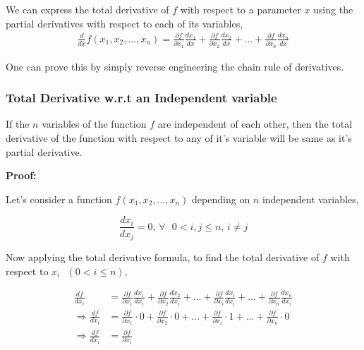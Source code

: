 \documentclass[12pt]{article}
\begin{document}
We can express the total derivative of $f$ with respect to a parameter $x$ using the partial derivatives with respect to each of its variables,
\begin{align}
    \frac{d}{dx}f(x_1, x_2, ..., x_n) = \frac{\partial f}{\partial x_1} \frac{dx_1}{dx} + \frac{\partial f}{\partial x_2} \frac{dx_2}{dx} + ... + \frac{\partial f}{\partial x_n} \frac{dx_n}{dx}
\end{align}

One can prove this by simply reverse engineering the chain rule of derivatives. \vspace{.2cm}

\subsubsection{Total Derivative w.r.t an Independent variable}

If the $n$ variables of the function $f$ are independent of each other, then the total derivative of the function with respect to any of it's variable will be same as it's partial derivative.

\begin{note}
    \textbf{Proof:} \vspace{.2cm}

    Let's consider a function $f(x_1, x_2, ..., x_n)$ depending on $n$ independent variables,

    \begin{equation*}
        \frac{dx_i}{dx_j} = 0 \text{,  } \forall \text{ } 0 < i, j \leq n \text{, } i \neq j
    \end{equation*}

    Now applying the total derivative formula, to find the total derivative of $f$ with respect to $x_i \text{ } (0 < i \leq n)$,

    \begin{align*}
        \frac{df}{dx_i} &= \frac{\partial f}{\partial x_1} \frac{dx_1}{dx_i} + \frac{\partial f}{\partial x_2} \frac{dx_2}{dx_i} + ... + \frac{\partial f}{\partial x_i} \frac{dx_i}{dx_i} + ... + \frac{\partial f}{\partial x_n} \frac{dx_n}{dx_i} \\
        \Rightarrow \frac{df}{dx_i} &= \frac{\partial f}{\partial x_1} \cdot 0 + \frac{\partial f}{\partial x_2} \cdot 0 + ... + \frac{\partial f}{\partial x_i} \cdot 1 + ... + \frac{\partial f}{\partial x_n} \cdot 0 \\
        \Rightarrow \frac{df}{dx_i} &= \frac{\partial f}{\partial x_i}
    \end{align*}
\end{note}
\end{document}
